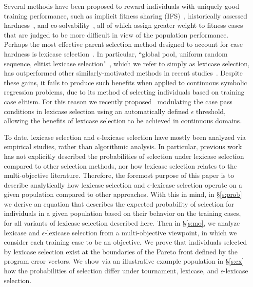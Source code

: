 \documentclass[twoside]{article}
\begin{document}
Several methods have been proposed to reward individuals with uniquely good training performance, such as implicit fitness sharing (IFS)~\citep{mckay_investigation_2001}, historically assessed hardness~\citep{klein_genetic_2008}, and co-solvability~\citep{schaefer_using_2010}, all of which assign greater weight to fitness cases that are judged to be more difficult in view of the population performance. Perhaps the most effective parent selection method designed to account for case hardness is lexicase selection~\citep{spector_assessment_2012}. In particular, ``global  pool,  uniform  random  sequence,  elitist  lexicase  selection"~\citep{spector_assessment_2012}, which we refer to simply as lexicase selection, has outperformed other similarly-motivated methods in recent studies~\citep{helmuth_solving_2014, helmuth_general_2015-1, liskowski_comparison_2015}. Despite these gains, it fails to produce such benefits when applied to continuous symbolic regression problems, due to its method of selecting individuals based on training case elitism. For this reason we recently proposed~\citep{la_cava_epsilon-lexicase_2016} modulating the case pass conditions in lexicase selection using an automatically defined $\epsilon$ threshold, allowing the benefits of lexicase selection to be achieved in continuous domains. 

To date, lexicase selection and $\epsilon$-lexicase selection have mostly been analyzed via empirical studies, rather than algorithmic analysis. In particular, previous work has not explicitly described the probabilities of selection under lexicase selection compared to other selection methods, nor how lexicase selection relates to the multi-objective literature. Therefore, the foremost purpose of this paper is to describe analytically how lexicase selection and $\epsilon$-lexicase selection operate on a given population compared to other approaches. With this in mind, in \S\ref{s:prob} we derive an equation that describes the expected probability of selection for individuals in a given population based on their behavior on the training cases, for all variants of lexicase selection described here. Then in \S\ref{s:mo}, we analyze lexicase and $\epsilon$-lexicase selection from a multi-objective viewpoint, in which we consider each training case to be an objective. We prove that individuals selected by lexicase selection exist at the boundaries of the Pareto front defined by the program error vectors. We show via an illustrative example population in \S\ref{s:ex} how the probabilities of selection differ under tournament, lexicase, and $\epsilon$-lexicase selection. 
\end{document}
